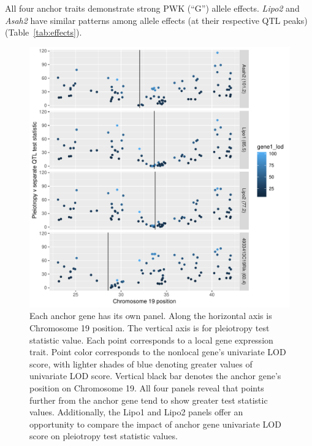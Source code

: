 \documentclass{article}
\begin{document}
All four anchor traits demonstrate strong PWK (``G'') allele effects. \emph{Lipo2} and \emph{Asah2} have similar patterns among allele effects (at their respective QTL peaks) (Table~\ref{tab:effects}). 



\begin{figure}
    \centering
    \includegraphics[width = \textwidth]{../Rmd/lrt-v-middle-of-gene.pdf}
    \caption[Pleiotropy LRT vs. chromosomal position plots reveal that higher values of pleiotropy LRT tend to correspond to greater interlocus distance and greater univariate LOD score.]{Each anchor gene has its own panel. Along the horizontal axis is Chromosome 19 position. The vertical axis is for pleiotropy test statistic value. Each point corresponds to a local gene expression trait. Point color corresponds to the nonlocal gene's univariate LOD score, with lighter shades of blue denoting greater values of univariate LOD score. Vertical black bar denotes the anchor gene's position on Chromosome 19. All four panels reveal that points further from the anchor gene tend to show greater test statistic values. Additionally, the Lipo1 and Lipo2 panels offer an opportunity to compare the impact of anchor gene univariate LOD score on pleiotropy test statistic values.}
    \label{fig:middle}
\end{figure}
\end{document}

